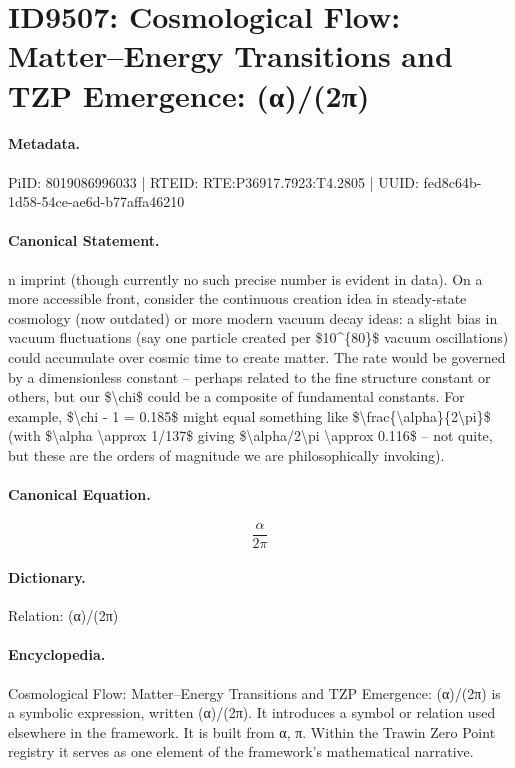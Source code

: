 \section*{ID9507: Cosmological Flow: Matter–Energy Transitions and TZP Emergence: (α)/(2π)}
\paragraph{Metadata.}
PiID: 8019086996033 | RTEID: RTE:P36917.7923:T4.2805 | UUID: fed8c64b-1d58-54ce-ae6d-b77affa46210

\paragraph{Canonical Statement.}
n imprint (though currently no such precise number is evident in data). On a more accessible front, consider the continuous creation idea in steady-state cosmology (now outdated) or more modern vacuum decay ideas: a slight bias in vacuum fluctuations (say one particle created per \$10\textasciicircum{}\{80\}\$ vacuum oscillations) could accumulate over cosmic time to create matter. The rate would be governed by a dimensionless constant – perhaps related to the fine structure constant or others, but our \$\textbackslash{}chi\$ could be a composite of fundamental constants. For example, \$\textbackslash{}chi - 1 = 0.185\$ might equal something like \$\textbackslash{}frac\{\textbackslash{}alpha\}\{2\textbackslash{}pi\}\$ (with \$\textbackslash{}alpha \textbackslash{}approx 1/137\$ giving \$\textbackslash{}alpha/2\textbackslash{}pi \textbackslash{}approx 0.116\$ – not quite, but these are the orders of magnitude we are philosophically invoking).

\paragraph{Canonical Equation.}
\[
\frac{\alpha}{2\pi}
\]

\paragraph{Dictionary.}
Relation: (α)/(2π)

\paragraph{Encyclopedia.}
Cosmological Flow: Matter–Energy Transitions and TZP Emergence: (α)/(2π) is a symbolic expression, written (α)/(2π). It introduces a symbol or relation used elsewhere in the framework. It is built from α, π. Within the Trawin Zero Point registry it serves as one element of the framework's mathematical narrative.
